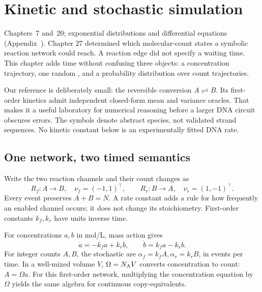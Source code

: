 \chapter{Kinetic and stochastic simulation}
{Chapters~7 and~20; exponential distributions and differential equations (Appendix~).}
Chapter 27 determined which molecular-count states a symbolic reaction network
could reach. A reaction edge did not specify a waiting time. This chapter adds
time without confusing three objects: a concentration trajectory, one random
, and a probability distribution over count trajectories.

Our reference is deliberately small: the reversible conversion $A\rightleftharpoons B$.
Its first-order kinetics admit independent closed-form mean and variance oracles.
That makes it a useful laboratory for numerical reasoning before a larger DNA
circuit obscures errors. The symbols denote abstract species, not validated strand
sequences. No kinetic constant below is an experimentally fitted DNA rate.

\section{One network, two timed semantics}
Write the two reaction channels and their count changes as
\[
R_f:A\longrightarrow B,\quad \nu_f=(-1,1)^\top,\qquad
R_r:B\longrightarrow A,\quad \nu_r=(1,-1)^\top.
\]
Every event preserves $A+B=N$. A rate constant adds a rule for how frequently an
enabled channel occurs; it does not change its stoichiometry. First-order constants
$k_f,k_r$ have units inverse time.

For concentrations $a,b$ in mol/L, mass action gives
\[
\dot a=-k_fa+k_rb,\qquad \dot b=k_fa-k_rb.
\]
For integer counts $A,B$, the stochastic  are
$\alpha_f=k_f A,\alpha_r=k_r B$, in events per time. In a well-mixed volume $V$,
$\Omega=N_{\rm A}V$ converts concentration to count: $A=\Omega a$. For this
first-order network, multiplying the concentration equation by $\Omega$ yields
the same algebra for continuous copy-equivalents.

